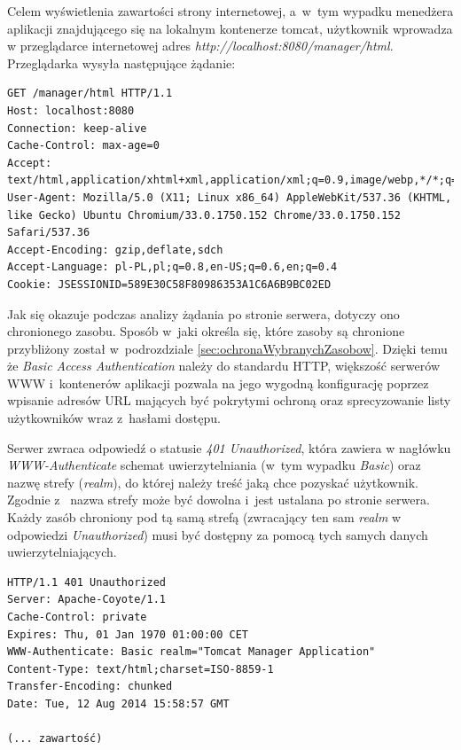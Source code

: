 \documentclass[11pt]{aghdpl}
\begin{document}

Celem wyświetlenia zawartości strony internetowej, a~w~tym wypadku menedżera aplikacji znajdującego się na lokalnym kontenerze tomcat, użytkownik wprowadza w przeglądarce internetowej adres \emph{http://localhost:8080/manager/html}. Przeglądarka wysyła następujące żądanie:
\begin{lstlisting}
GET /manager/html HTTP/1.1
Host: localhost:8080
Connection: keep-alive
Cache-Control: max-age=0
Accept: text/html,application/xhtml+xml,application/xml;q=0.9,image/webp,*/*;q=0.8
User-Agent: Mozilla/5.0 (X11; Linux x86_64) AppleWebKit/537.36 (KHTML, like Gecko) Ubuntu Chromium/33.0.1750.152 Chrome/33.0.1750.152 Safari/537.36
Accept-Encoding: gzip,deflate,sdch
Accept-Language: pl-PL,pl;q=0.8,en-US;q=0.6,en;q=0.4
Cookie: JSESSIONID=589E30C58F80986353A1C6A6B9BC02ED
\end{lstlisting}

Jak się okazuje podczas analizy żądania po stronie serwera, dotyczy ono chronionego zasobu. Sposób w~jaki określa się, które zasoby są chronione przybliżony został w~podrozdziale \ref{sec:ochronaWybranychZasobow}. Dzięki temu że \emph{Basic Access Authentication} należy do standardu HTTP, większość serwerów WWW i~kontenerów aplikacji pozwala na jego wygodną konfigurację poprzez wpisanie adresów URL mających być pokrytymi ochroną oraz sprecyzowanie listy użytkowników wraz z~hasłami dostępu.

Serwer zwraca odpowiedź o statusie \emph{401 Unauthorized}, która zawiera w nagłówku \emph{WWW-Authenticate} schemat uwierzytelniania (w~tym wypadku \emph{Basic}) oraz nazwę strefy (\emph{realm}), do której należy treść jaką chce pozyskać użytkownik. Zgodnie z~\cite{BDA99} nazwa strefy może być dowolna i~jest ustalana po stronie serwera. Każdy zasób chroniony pod tą samą strefą (zwracający ten sam \emph{realm} w odpowiedzi \emph{Unauthorized}) musi być dostępny za pomocą tych samych danych uwierzytelniających.
\begin{lstlisting}
HTTP/1.1 401 Unauthorized
Server: Apache-Coyote/1.1
Cache-Control: private
Expires: Thu, 01 Jan 1970 01:00:00 CET
WWW-Authenticate: Basic realm="Tomcat Manager Application"
Content-Type: text/html;charset=ISO-8859-1
Transfer-Encoding: chunked
Date: Tue, 12 Aug 2014 15:58:57 GMT

(... zawartość)
\end{lstlisting}
\end{document}
